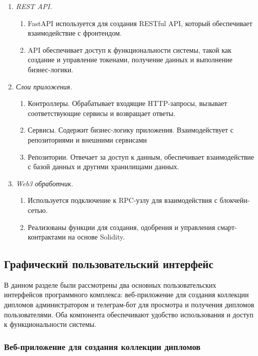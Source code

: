 \begin{enumerate}
    \item \textit{REST API.}
    \begin{enumerate}
        \item FastAPI используется для создания RESTful API, который обеспечивает взаимодействие с фронтендом.
        \item API обеспечивает доступ к функциональности системы, такой как создание и управление токенами, получение данных и выполнение бизнес-логики.
    \end{enumerate}
    \item \textit{Слои приложения.}
    \begin{enumerate}
        \item Контроллеры. Обрабатывает входящие HTTP-запросы, вызывает соответствующие сервисы и возвращает ответы.
        \item Сервисы. Содержит бизнес-логику приложения. Взаимодействует с репозиториями и внешними сервисами
        \item Репозитории. Отвечает за доступ к данным, обеспечивает взаимодействие с базой данных и другими хранилищами данных.
    \end{enumerate}
    \item \textit{Web3 обработчик.}
    \begin{enumerate}
        \item Используется подключение к RPC-узлу для взаимодействия с блокчейн-сетью.
        \item Реализованы функции для создания, одобрения и управления смарт-контрактами на основе Solidity.
    \end{enumerate}
\end{enumerate}

\subsection{Графический пользовательский интерфейс}

В данном разделе были рассмотрены два основных пользовательских интерфейсов программного комплекса: веб-приложение для создания коллекции дипломов администратором и телеграм-бот для просмотра и получения дипломов пользователями. Оба компонента обеспечивают удобство использования и доступ к функциональности системы.

\subsubsection{Веб-приложение для создания коллекции дипломов}

